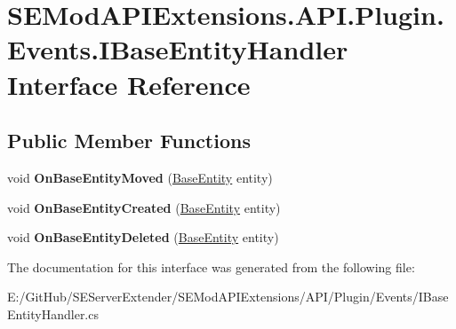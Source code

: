 \hypertarget{interface_s_e_mod_a_p_i_extensions_1_1_a_p_i_1_1_plugin_1_1_events_1_1_i_base_entity_handler}{}\section{S\+E\+Mod\+A\+P\+I\+Extensions.\+A\+P\+I.\+Plugin.\+Events.\+I\+Base\+Entity\+Handler Interface Reference}
\label{interface_s_e_mod_a_p_i_extensions_1_1_a_p_i_1_1_plugin_1_1_events_1_1_i_base_entity_handler}
\subsection*{Public Member Functions}
\begin{DoxyCompactItemize}
\item 
\hypertarget{interface_s_e_mod_a_p_i_extensions_1_1_a_p_i_1_1_plugin_1_1_events_1_1_i_base_entity_handler_a394cffe8cd24517fbdc8c9b8e74ae715}{}void {\bfseries On\+Base\+Entity\+Moved} (\hyperlink{class_s_e_mod_a_p_i_internal_1_1_a_p_i_1_1_entity_1_1_base_entity}{Base\+Entity} entity)\label{interface_s_e_mod_a_p_i_extensions_1_1_a_p_i_1_1_plugin_1_1_events_1_1_i_base_entity_handler_a394cffe8cd24517fbdc8c9b8e74ae715}

\item 
\hypertarget{interface_s_e_mod_a_p_i_extensions_1_1_a_p_i_1_1_plugin_1_1_events_1_1_i_base_entity_handler_a8b9ddde49effb384f1dacc44be790232}{}void {\bfseries On\+Base\+Entity\+Created} (\hyperlink{class_s_e_mod_a_p_i_internal_1_1_a_p_i_1_1_entity_1_1_base_entity}{Base\+Entity} entity)\label{interface_s_e_mod_a_p_i_extensions_1_1_a_p_i_1_1_plugin_1_1_events_1_1_i_base_entity_handler_a8b9ddde49effb384f1dacc44be790232}

\item 
\hypertarget{interface_s_e_mod_a_p_i_extensions_1_1_a_p_i_1_1_plugin_1_1_events_1_1_i_base_entity_handler_a513156f26e63c851a67605e647bda70a}{}void {\bfseries On\+Base\+Entity\+Deleted} (\hyperlink{class_s_e_mod_a_p_i_internal_1_1_a_p_i_1_1_entity_1_1_base_entity}{Base\+Entity} entity)\label{interface_s_e_mod_a_p_i_extensions_1_1_a_p_i_1_1_plugin_1_1_events_1_1_i_base_entity_handler_a513156f26e63c851a67605e647bda70a}

\end{DoxyCompactItemize}


The documentation for this interface was generated from the following file\+:\begin{DoxyCompactItemize}
\item 
E\+:/\+Git\+Hub/\+S\+E\+Server\+Extender/\+S\+E\+Mod\+A\+P\+I\+Extensions/\+A\+P\+I/\+Plugin/\+Events/I\+Base\+Entity\+Handler.\+cs\end{DoxyCompactItemize}
